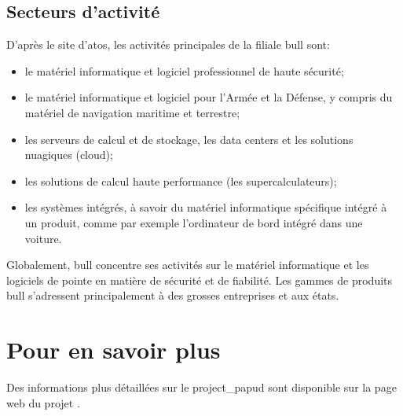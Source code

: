\subsection*{Secteurs d'activité}
D'après {le site d'\gls{atos}\autocite{bull_produits}}, les activités principales de la filiale \gls{bull} sont:
\begin{itemize}
	\item le matériel informatique et logiciel professionnel de haute sécurité;
	\item le matériel informatique et logiciel pour l'Armée et la Défense, y compris du matériel de navigation maritime et terrestre;
	\item les serveurs de calcul et de stockage, les \gls{data centers} et les solutions nuagiques (\gls{cloud});
	\item les solutions de calcul haute performance (les \og supercalculateurs\fg{});
	\item les systèmes intégrés, à savoir du matériel informatique spécifique intégré à un produit, comme par exemple l'ordinateur de bord intégré dans une voiture.
\end{itemize}
\vspace{1em}

Globalement, \gls{bull} concentre ses activités sur le matériel informatique et les logiciels de pointe en matière de sécurité et de fiabilité.
Les gammes de produits \gls{bull} s'adressent principalement à des grosses entreprises et aux états.

\section*{Pour en savoir plus}
Des informations plus détaillées sur le \gls{project_papud} sont disponible sur la page web du projet \autocite{about_papud}.